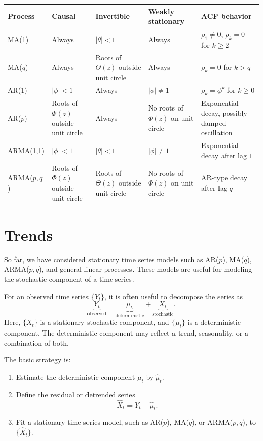 \documentclass[12pt,oneside]{book}
\numberwithin{equation}{section}
\theoremstyle{definition}
\theoremstyle{plain}
\theoremstyle{remark}
\begin{document}
\begin{xltabular}{\textwidth}{l l l l l}
\toprule
Process & Causal & Invertible & Weakly stationary & ACF behavior \\
\midrule
MA(1)
& Always
& $|\theta|<1$
& Always
& $\rho_1\neq 0$, $\rho_k=0$ for $k\geq 2$ \\

MA($q$)
& Always
& Roots of $\Theta(z)$ outside unit circle
& Always
& $\rho_k=0$ for $k>q$ \\

AR(1)
& $|\phi|<1$
& Always
& $|\phi|\neq 1$
& $\rho_k=\phi^k$ for $k\geq 0$ \\

AR($p$)
& Roots of $\Phi(z)$ outside unit circle
& Always
& No roots of $\Phi(z)$ on unit circle
& Exponential decay, possibly damped oscillation \\

ARMA(1,1)
& $|\phi|<1$
& $|\theta|<1$
& $|\phi|\neq 1$
& Exponential decay after lag $1$ \\

ARMA($p,q$)
& Roots of $\Phi(z)$ outside unit circle
& Roots of $\Theta(z)$ outside unit circle
& No roots of $\Phi(z)$ on unit circle
& AR-type decay after lag $q$ \\
\bottomrule
\end{xltabular}

\section{Trends}

So far, we have considered stationary time series models such as AR($p$), MA($q$), ARMA($p,q$), and general linear processes. These models are useful for modeling the stochastic component of a time series.

For an observed time series $\{Y_t\}$, it is often useful to decompose the series as
\[
\underbrace{Y_t}_{\text{observed}}
=
\underbrace{\mu_t}_{\text{deterministic}}
+
\underbrace{X_t}_{\text{stochastic}}.
\]
Here, $\{X_t\}$ is a stationary stochastic component, and $\{\mu_t\}$ is a deterministic component. The deterministic component may reflect a trend, seasonality, or a combination of both.

The basic strategy is:

\begin{enumerate}
\item Estimate the deterministic component $\mu_t$ by $\widehat{\mu}_t$.
\item Define the residual or detrended series
\[
\widehat{X}_t=Y_t-\widehat{\mu}_t.
\]
\item Fit a stationary time series model, such as AR($p$), MA($q$), or ARMA($p,q$), to $\{\widehat{X}_t\}$.
\end{enumerate}
\end{document}

